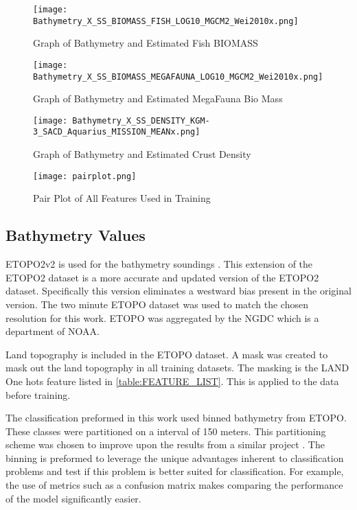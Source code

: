 \begin{figure}[h]
    \centering
    \texttt{[image: Bathymetry\_X\_SS\_BIOMASS\_FISH\_LOG10\_MGCM2\_Wei2010x.png]}
    \caption{Graph of Bathymetry and Estimated Fish BIOMASS}
    \label{fig:bathyxfish}
\end{figure}

\begin{figure}[h]
    \centering
    \texttt{[image: Bathymetry\_X\_SS\_BIOMASS\_MEGAFAUNA\_LOG10\_MGCM2\_Wei2010x.png]}
    \caption{Graph of Bathymetry and Estimated MegaFauna Bio Mass}
    \label{fig:bathyxfauna}
\end{figure}

\begin{figure}[h]
    \centering
    \texttt{[image: Bathymetry\_X\_SS\_DENSITY\_KGM-3\_SACD\_Aquarius\_MISSION\_MEANx.png]}
    \caption{Graph of Bathymetry and Estimated Crust Density}
    \label{fig:bathyxdensity}
\end{figure}

\begin{figure}[h]
    \centering
    \texttt{[image: pairplot.png]}
    \caption{Pair Plot of All Features Used in Training}
    \label{fig:pairplot}
\end{figure}


\subsection{Bathymetry Values}
ETOPO2v2 is used for the bathymetry soundings \cite{national20062}.
This extension of the ETOPO2 dataset \cite{national1988etopo} is a more accurate and updated version of the ETOPO2 dataset.
Specifically this version eliminates a westward bias present in the original version.
The two minute \ac{ETOPO} dataset was used to match the chosen resolution for this work.
\ac{ETOPO} was aggregated by the \ac{NGDC} which is a department of \ac{NOAA}.

\par
Land topography is included in the \ac{ETOPO} dataset.
A mask was created to mask out the land topography in all training datasets.
The masking is the LAND One hots feature listed in \ref{table:FEATURE_LIST}.
This is applied to the data before training.

\par
The classification preformed in this work used binned bathymetry from \ac{ETOPO}.
These classes were partitioned on a interval of 150 meters.
This partitioning scheme was chosen to improve upon the results from a similar project \cite{jena2012prediction}.
The binning is preformed to leverage the unique advantages inherent to classification problems and test if this problem is better suited for classification.
For example, the use of metrics such as a confusion matrix makes comparing the performance of the model significantly easier.
